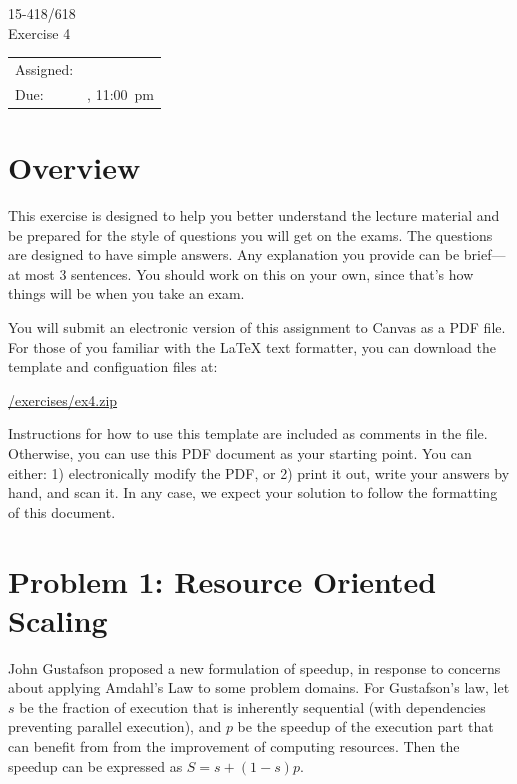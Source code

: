 \documentclass[11pt]{article}
\newcommand{\cref}[2]{\href{#1}{\color{blue}#2}}
\begin{document}
                          
\vspace*{0.3in}                            
\begin{center}
\LARGE
15-418/618 \thisterm{} \\
Exercise 4
\end{center}

\begin{center}
\Large        
\begin{tabular}{ll}
\hline             
Assigned: & \dateassigned{}  \\
Due: &  \datedue{}, 11:00~pm  \\
\hline       
\end{tabular}
\end{center} 

\section*{Overview}

This exercise is designed to help you better understand the lecture
material and be prepared for the style of questions you will get on
the exams.  The questions are designed to have simple answers.  Any
explanation you provide can be brief---at most 3 sentences.  You
should work on this on your own, since that's how things will be when
you take an exam.

You will submit an electronic version of this assignment to Canvas 
as a PDF file.  For those of you familiar with the \LaTeX{} text 
formatter, you can download the template and configuation files at: 
\begin{center} 
  \cref{\actualcoursehome/exercises/ex4.zip}{\visiblecoursehome/exercises/ex4.zip} 
\end{center} 
Instructions for how to use this template are included as comments in 
the file.  Otherwise, you can use this PDF document as your starting 
point.  You can either: 1) electronically modify the PDF, or 2) print 
it out, write your answers by hand, and scan it.  In any case, we 
expect your solution to follow the formatting of this document. 

\newpage 
\section*{Problem 1: Resource Oriented Scaling}
John Gustafson proposed a new formulation of speedup, in response to concerns about applying Amdahl's Law to some problem domains. For Gustafson's law, let $s$ be the fraction of execution that is inherently sequential (with dependencies preventing parallel execution), and $p$ be the speedup of the execution part that can benefit from from the improvement of computing resources. Then the speedup can be expressed as $S = s + (1-s)p$.
\end{document}
